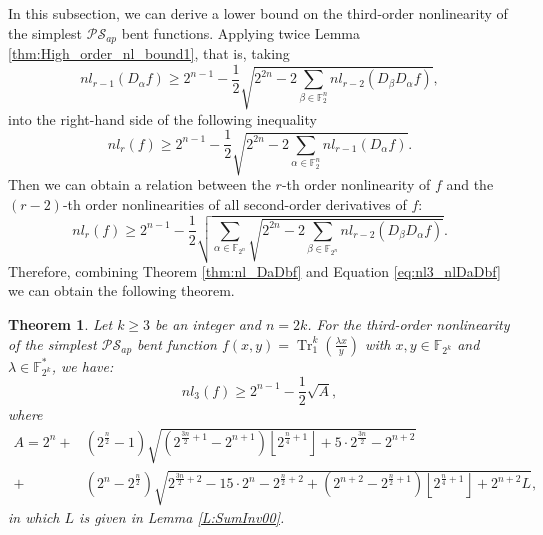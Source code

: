 \documentclass{article}
\newcommand{\F}{\mathbb{F}}
\newcommand{\0}{\textbf{0}}
\newcommand{\1}{\textbf{1}}
\newcommand{\TRACE}{\operatorname{Tr}_1^k}
\theoremstyle{plain}
\newtheorem{theorem}{Theorem}
\begin{document}
In this subsection,  we can derive a lower bound on the third-order nonlinearity of the simplest $\mathcal{PS}_{ap}$ bent functions.
Applying twice Lemma \ref{thm:High_order_nl_bound1}, that is, taking
    \[nl_{r-1}(D_{\alpha}f) \ge 2^{n-1}-\frac{1}{2}\sqrt{2^{2n}-2\sum_{\beta\in\F_2^n}nl_{r-2}(D_{\beta}D_{\alpha}f)},\]
    into the right-hand side of the following inequality
    \[nl_r(f) \ge 2^{n-1}-\frac{1}{2}\sqrt{2^{2n}-2\sum_{\alpha\in\F_2^n}nl_{r-1}(D_{\alpha}f)}.\]
    Then we can obtain a relation between the $r$-th order nonlinearity of $f$ and the $(r-2)$-th order nonlinearities of all second-order derivatives of $f$:
    \begin{equation}\label{eq:nl3_nlDaDbf}
        nl_r(f)\ge 2^{n-1}-\frac{1}{2}\sqrt{\sum_{\alpha\in\F_{2^n}}\sqrt{2^{2n}-2\sum_{\beta\in\F_{2^n}} nl_{r-2}(D_{\beta}D_{\alpha}f)}}.
    \end{equation}
    Therefore, combining Theorem \ref{thm:nl_DaDbf} and Equation \eqref{eq:nl3_nlDaDbf} we can obtain the following theorem.
    \begin{theorem}\label{th:our_lower_bound}
        Let $k\ge 3$ be an integer and $n=2k$. For the third-order nonlinearity of the simplest $\mathcal{PS}_{ap}$ bent function $f(x,y)=\TRACE(\frac{\lambda x}{y})$ with $x,y\in\F_{2^k}$ and $\lambda\in\F_{2^k}^*$, we have:
        \[nl_3(f)\ge 2^{n-1}-\frac{1}{2}\sqrt{A},\]
        where
        \begin{align*}
            A=2^n+&(2^{\frac{n}{2}}-1)\sqrt{(2^{\frac{3n}{2}+1}-2^{n+1})\left\lfloor 2^{\frac{n}{4}+1}\right\rfloor+5\cdot 2^{\frac{3n}{2}}-2^{n+2}}\\
            +&(2^n-2^{\frac{n}{2}})\sqrt{2^{\frac{3n}{2}+2}-15\cdot 2^n-2^{\frac{n}{2}+2}+(2^{n+2}-2^{\frac{n}{2}+1})\left\lfloor 2^{\frac{n}{4}+1}\right\rfloor+2^{n+2}L},
        \end{align*}
       in which $L$ is given in Lemma \ref{L:SumInv00}.
    \end{theorem}
\end{document}
